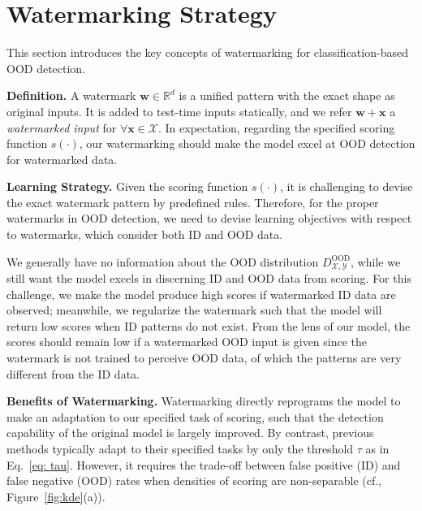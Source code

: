 \documentclass{article}
\begin{document}
\section{Watermarking Strategy}
\label{sec: heuristic}

This section introduces the key concepts of watermarking for classification-based OOD detection.

\textbf{Definition.} A watermark $\boldsymbol{w}\in\mathbb{R}^d$ is a unified pattern with the exact shape as original inputs. It is added to test-time inputs statically, and we refer $\boldsymbol{w}+\boldsymbol{x}$ a \emph{watermarked input} for $\forall\boldsymbol{x}\in\mathcal{X}$. In expectation, regarding the specified scoring function $s(\cdot)$, our watermarking should make the model excel at OOD detection for watermarked data. 



\textbf{Learning Strategy.} Given the scoring function $s(\cdot)$, it is challenging to devise the exact watermark pattern by predefined rules. Therefore, for the proper watermarks in OOD detection, we need to devise learning objectives with respect to watermarks, which consider both ID and OOD data. 

{We generally have no information about the OOD distribution $D_{\mathcal{X},\mathcal{Y}}^\text{OOD}$, while we still want the model excels in discerning ID and OOD data from scoring. For this challenge, we make the model produce high scores if watermarked ID data are observed; meanwhile, we regularize the watermark such that the model will return low scores when ID patterns do not exist. From the lens of our model, the scores should remain low if a watermarked OOD input is given since the watermark is not trained to perceive OOD data, of which the patterns are very different from the ID data.}









\textbf{Benefits of Watermarking.} Watermarking directly reprograms the model to make an adaptation to our specified task of scoring, such that the detection capability of the original model is largely improved. By contrast, previous methods typically adapt to their specified tasks by only the threshold $\tau$ as in Eq.~\eqref{eq: tau}. However, it requires the trade-off between false positive (ID) and false negative (OOD) rates when densities of scoring are non-separable (cf., Figure~\ref{fig:kde}(a)). 
\end{document}
